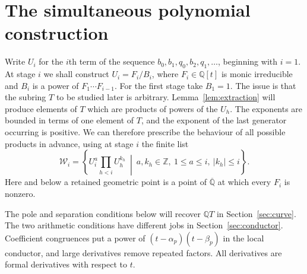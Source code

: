 \section{The simultaneous polynomial construction}
\label{sec:construction}

Write $U_i$ for the $i$th term of the sequence $b_0, b_1, q_0, b_2, q_1, \ldots$, beginning with $i = 1$.
At stage $i$ we shall construct $U_i = F_i / B_i$, where $F_i \in \mathbb{Q}[t]$ is monic irreducible and $B_i$ is a power of $F_1 \cdots F_{i - 1}$.
For the first stage take $B_1 = 1$.
The issue is that the subring $T$ to be studied later is arbitrary.
Lemma~\ref{lem:extraction} will produce elements of $T$ which are products of powers of the $U_h$.
The exponents are bounded in terms of one element of $T$, and the exponent of the last generator occurring is positive.
We can therefore prescribe the behaviour of all possible products in advance, using at stage $i$ the finite list
\[
    \mathcal{W}_i
    = \left\{U_i^{a} \prod_{h < i} U_h^{k_h}
      \ \middle|\ a, k_h \in \mathbb{Z},\ 1 \le a \le i,\ |k_h| \le i\right\}.
\]
Here and below a retained geometric point is a point of $\overline{\mathbb{Q}}$ at which every $F_i$ is nonzero.

The pole and separation conditions below will recover $\mathbb{Q}T$ in Section~\ref{sec:curve}.
The two arithmetic conditions have different jobs in Section~\ref{sec:conductor}.
Coefficient congruences put a power of $(t - \alpha_p)(t - \beta_p)$ in the local conductor, and large derivatives remove repeated factors.
All derivatives are formal derivatives with respect to $t$.

